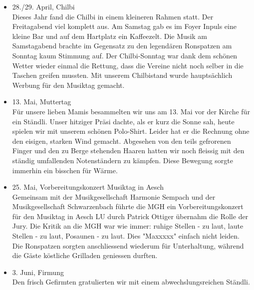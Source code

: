 \begin{history}
\begin{itemize}
            \item 28./29. April, Chilbi\\
                  Dieses Jahr fand die Chilbi in einem kleineren Rahmen statt. Der
                  Freitagabend viel komplett aus. Am Samstag gab es im Foyer Inpuls eine
                  kleine Bar und auf dem Hartplatz ein Kaffeezelt. Die Musik am
                  Samstagabend brachte im Gegensatz zu den legendären Ronspatzen am
                  Sonntag kaum Stimmung auf. Der Chilbi-Sonntag war dank dem schönen
                  Wetter wieder einmal die Rettung, dass die Vereine nicht noch selber in
                  die Taschen greifen mussten. Mit unserem Chilbistand wurde hauptsächlich
                  Werbung für den Musiktag gemacht.

            \item 13. Mai, Muttertag\\
                  Für unsere lieben Mamis besammelten wir uns am 13. Mai vor der Kirche
                  für ein Ständli. Unser hitziger Präsi dachte, als er kurz die Sonne sah,
                  heute spielen wir mit unserem schönen Polo-Shirt. Leider hat er die
                  Rechnung ohne den eisigen, starken Wind gemacht. Abgesehen von den teils
                  gefrorenen Finger und den zu Berge stehenden Haaren hatten wir noch
                  fleissig mit den ständig umfallenden Notenständern zu kämpfen. Diese
                  Bewegung sorgte immerhin ein bisschen für Wärme.

            \item 25. Mai, Vorbereitungskonzert Musiktag in Aesch\\
                  Gemeinsam mit der Musikgesellschaft Harmonie Sempach und der
                  Musikgesellschaft Schwarzenbach führte die MGH ein Vorbereitungskonzert
                  für den Musiktag in Aesch LU durch Patrick Ottiger übernahm die Rolle
                  der Jury. Die Kritik an die MGH war wie immer: ruhige Stellen - zu laut,
                  laute Stellen - zu laut, Posaunen - zu laut. Dies "Maxxxxx" einfach
                  nicht leiden. Die Ronspatzen sorgten anschliessend wiederum für
                  Unterhaltung, während die Gäste köstliche Grilladen geniessen durften.

            \item 3. Juni, Firmung\\
                  Den frisch Gefirmten gratulierten wir mit einem abwechslungsreichen
                  Ständli.


\end{itemize}
\end{history}
